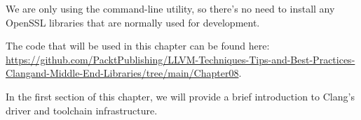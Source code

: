 We are only using the command-line utility, so there's no need to install any OpenSSL libraries that are normally used for development.

The code that will be used in this chapter can be found here: \url{https://github.com/PacktPublishing/LLVM-Techniques-Tips-and-Best-Practices-Clangand-Middle-End-Libraries/tree/main/Chapter08}.

In the first section of this chapter, we will provide a brief introduction to Clang's driver and toolchain infrastructure.




















